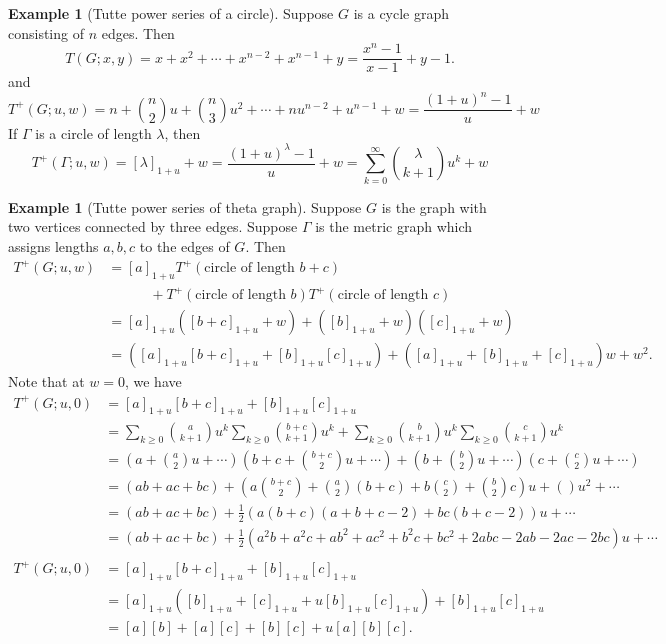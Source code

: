 \documentclass{amsart}
\theoremstyle{definition}
\newtheorem{eg}[thm]{Example}
\begin{document}
\begin{eg}[Tutte power series of a circle]
Suppose $G$ is a cycle graph consisting of $n$ edges.
Then
$$
T(G;x,y) = x + x^2 + \cdots + x^{n-2} + x^{n-1} + y 
= \frac{x^n - 1}{x - 1} + y - 1.
$$
and
$$
T^+(G;u,w) = n + \binom{n}{2}u + \binom{n}{3} u^2 + \cdots + nu^{n-2} + u^{n-1} + w
= \frac{(1+u)^n-1}{u} + w
$$
If $\Gamma$ is a circle of length $\lambda$, then 
$$
T^+(\Gamma;u,w) = [\lambda]_{1+u}  + w =  \frac{(1 + u)^\lambda - 1}{u} + w
= \sum_{k=0}^\infty \binom{\lambda}{k+1} u^{k} + w
$$
\end{eg}

\begin{eg}[Tutte power series of theta graph]
Suppose $G$ is the graph with two vertices connected by three edges.
Suppose $\Gamma$ is the metric graph which assigns lengths $a,b,c$ to the edges of $G$.
Then
\begin{align*}
T^+(G;u,w) &= [a]_{1+u} T^+(\text{circle of length }b+c) \\
&\qquad\quad + T^+(\text{circle of length }b)T^+(\text{circle of length }c) \\
&= [a]_{1+u} ([b+c]_{1+u} + w)
+ ([b]_{1+u} + w) ([c]_{1+u} + w) \\
&= ([a]_{1+u} [b+c]_{1+u} + [b]_{1+u}[c]_{1+u} ) + 
([a]_{1+u} + [b]_{1+u} + [c]_{1+u}) w + w^2 .
\end{align*}
Note that at $w = 0$, we have
\begin{align*}
T^+(G;u,0) &= [a]_{1+u} [b+c]_{1+u} + [b]_{1+u}[c]_{1+u} \\
&= \sum_{k\geq 0}\binom{a}{k+1}u^k \sum_{k\geq 0} \binom{b+c}{k+1}u^k + \sum_{k\geq 0}\binom{b}{k+1}u^k \sum_{k\geq 0}\binom{c}{k+1}u^k \\
&= \left( a + \binom{a}{2}u + \cdots\right) \left(b + c + \binom{b+c}{2} u + \cdots\right) + \left(b + \binom{b}{2}u + \cdots\right) \left(c + \binom{c}{2}u + \cdots\right) \\
&= (ab + ac + bc) + \left(a\binom{b+c}{2} + \binom{a}{2}(b+c) + b\binom{c}{2} + \binom{b}{2} c \right)u + () u^2 + \cdots  \\
&= (ab + ac + bc) + \frac12 \left(a(b+c)(a+b+c-2) + bc(b+c-2) \right)u + \cdots \\
&= (ab + ac + bc) + \frac12 \left(a^2b + a^2c +ab^2 +ac^2 + b^2c + bc^2 + 2abc-2ab - 2ac - 2bc \right)u + \cdots \\
\end{align*}
\begin{align*}
T^+(G;u,0) &= [a]_{1+u} [b+c]_{1+u} + [b]_{1+u}[c]_{1+u} \\
&= [a]_{1+u} \left([b]_{1+u} + [c]_{1+u} + u[b]_{1+u} [c]_{1+u} \right) + [b]_{1+u} [c]_{1+u} \\
&= [a][b] + [a][c] + [b][c] + u[a][b][c] .
\end{align*}

\end{eg}
\end{document}
